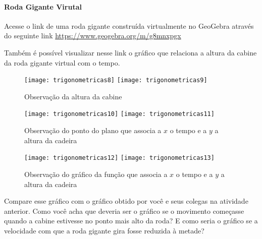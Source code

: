 \begin{reflection}
\label{trig-reflection1}
\vspace{-2\parskip}
\paragraph{Roda Gigante Virutal}

Acesse o link de uma roda gigante construída virtualmente no GeoGebra através do seguinte link \url{https://www.geogebra.org/m/g8mnxpgx}

Também é possível visualizar nesse link o gráfico que relaciona a altura da cabine da roda gigante virtual com o tempo.

\begin{figure}[H]
\centering

\texttt{[image: trigonometricas8]}
\texttt{[image: trigonometricas9]}
\caption{Observação da altura da cabine}

\end{figure}

\begin{figure}[H]
\centering

\texttt{[image: trigonometricas10]}
\texttt{[image: trigonometricas11]}
\caption{Observação do ponto do plano que associa a $x$ o tempo e a $y$ a altura da cadeira}
\end{figure}

\begin{figure}[H]
\centering

\texttt{[image: trigonometricas12]}
\texttt{[image: trigonometricas13]}
\caption{Observação do gráfico da função que associa a $x$ o tempo e a $y$ a altura da cadeira}
\end{figure}

Compare esse gráfico com o gráfico obtido por você e seus colegas na atividade anterior. Como você acha que deveria ser o gráfico se o movimento começasse quando a cabine estivesse no ponto mais alto da roda? E como seria o gráfico se a velocidade com que a roda gigante gira fosse reduzida à metade?
\end{reflection}

